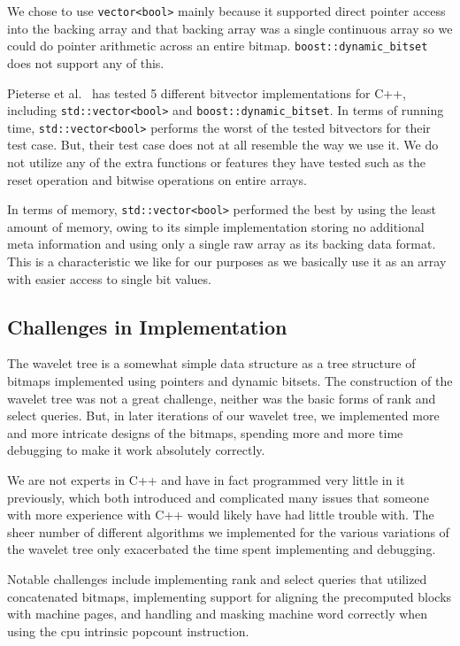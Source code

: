 We chose to use \texttt{vector<bool>} mainly because it supported direct pointer access into the backing array and that backing array was a single continuous array so we could do pointer arithmetic across an entire bitmap.
\texttt{boost::dynamic\_bitset} does not support any of this.

Pieterse et al.~ has tested 5 different bitvector implementations for C++, including \texttt{std::vector<bool>} and \texttt{boost::dynamic\_bitset}.
In terms of running time, \texttt{std::vector<bool>} performs the worst of the tested bitvectors for their test case.
But, their test case does not at all resemble the way we use it.
We do not utilize any of the extra functions or features they have tested such as the reset operation and bitwise operations on entire arrays.

In terms of memory, \texttt{std::vector<bool>} performed the best by using the least amount of memory, owing to its simple implementation storing no additional meta information and using only a single raw array as its backing data format.
This is a characteristic we like for our purposes as we basically use it as an array with easier access to single bit values.

\subsection{Challenges in Implementation}
The wavelet tree is a somewhat simple data structure as a tree structure of bitmaps implemented using pointers and dynamic bitsets.
The construction of the wavelet tree was not a great challenge, neither was the basic forms of rank and select queries.
But, in later iterations of our wavelet tree, we implemented more and more intricate designs of the bitmaps, spending more and more time debugging to make it work absolutely correctly.

We are not experts in C++ and have in fact programmed very little in it previously, which both introduced and complicated many issues that someone with more experience with C++ would likely have had little trouble with.
The sheer number of different algorithms we implemented for the various variations of the wavelet tree only exacerbated the time spent implementing and debugging.

Notable challenges include implementing rank and select queries that utilized concatenated bitmaps, implementing support for aligning the precomputed blocks with machine pages, and handling and masking machine word correctly when using the cpu intrinsic popcount instruction.


